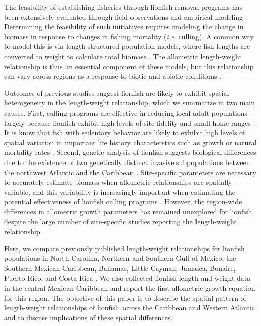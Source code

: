 \documentclass[smallextended]{svjour3}       %
\begin{document}
The feasibility of establishing fisheries through lionfish removal
programs has been extensively evaluated through field observations and
empirical modeling
\citep{barbour_2011,morris_2011,deleon_2013,johnston_2015,sandel_2015,usseglio_2017}.
Determining the feasibility of such initiatives requires modeling the
change in biomass in response to changes in fishing mortality
(\emph{i.e.} culling). A common way to model this is via
length-structured population models, where fish lengths are converted to
weight to calculate total biomass
\citep{barbour_2011,cote_2014,andradibrown_2017}. The allometric
length-weight relationship is thus an essential component of these
models, but this relationship can vary across regions as a response to
biotic and abiotic conditions \citep{johnson_2016}.

Outcomes of previous studies suggest lionfish are likely to exhibit
spatial heterogeneity in the length-weight relationship, which we
summarize in two main causes. First, culling programs are effective in
reducing local adult populations largely because lionfish exhibit high
levels of site fidelity and small home ranges
\citep{Fishelson_1997,kochzius_2005,jud_2012,cote_2014}. It is know that
fish with sedentary behavior are likely to exhibit high levels of
spatial variation in important life history characterstics such as
growth or natural mortality rates
\citep{gunderson_2008,hutchinson_2008,wilson_2012,guan_2013}. Second,
genetic analysis of lionfish suggests biological differences due to the
existence of two genetically distinct invasive subpopulations between
the northwest Atlantic and the Caribbean \citep{betancurr_2011}.
Site-specific parameters are necessary to accurately estimate biomass
when allometric relationships are spatially variable, and this
variability is increasingly important when estimating the potential
effectiveness of lionfish culling programs
\citep{barbour_2011,morris_2011,cote_2014,johnston_2015}. However, the
region-wide differences in allometric growth parameters has remained
unexplored for lionfish, despite the large number of site-specific
studies reporting the length-weight relationship.

Here, we compare previously published length-weight relationships for
lionfish populations in North Carolina, Northern and Southern Gulf of
Mexico, the Southern Mexican Caribbean, Bahamas, Little Cayman, Jamaica,
Bonaire, Puerto Rico, and Costa Rica
\citep{barbour_2011,darling_2011,deleon_2013,fogg_2013,dahl_2014,edwards_2014,toledohernndez_2014,sandel_2015,aguilarperera_2016,sabidoitza_2016,sabidoitz_2016,chin_2016}.
We also collected lionfish length and weight data in the central Mexican
Caribbean and report the first allometric growth equation for this
region. The objective of this paper is to describe the spatial pattern
of length-weight relationships of lionfish across the Caribbean and
Western Atlantic and to discuss implications of these spatial
differences.
\end{document}
